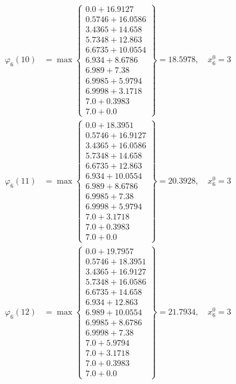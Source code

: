 \documentclass{article}
\begin{document}
\begin{align*}
  
  
  
\varphi_{6}(10) &= \max \left\{ \begin{array}{c}
0.0 + 16.9127 \\
 0.5746 + 16.0586 \\
 3.4365 + 14.658 \\
 5.7348 + 12.863 \\
 6.6735 + 10.0554 \\
 6.934 + 8.6786 \\
 6.989 + 7.38 \\
 6.9985 + 5.9794 \\
 6.9998 + 3.1718 \\
 7.0 + 0.3983 \\
 7.0 + 0.0
\end{array} \right\}=18.5978,\quad x_{6}^0=3\\
  
  
  
  
\varphi_{6}(11) &= \max \left\{ \begin{array}{c}
0.0 + 18.3951 \\
 0.5746 + 16.9127 \\
 3.4365 + 16.0586 \\
 5.7348 + 14.658 \\
 6.6735 + 12.863 \\
 6.934 + 10.0554 \\
 6.989 + 8.6786 \\
 6.9985 + 7.38 \\
 6.9998 + 5.9794 \\
 7.0 + 3.1718 \\
 7.0 + 0.3983 \\
 7.0 + 0.0
\end{array} \right\}=20.3928,\quad x_{6}^0=3\\
  
  
  
  
\varphi_{6}(12) &= \max \left\{ \begin{array}{c}
0.0 + 19.7957 \\
 0.5746 + 18.3951 \\
 3.4365 + 16.9127 \\
 5.7348 + 16.0586 \\
 6.6735 + 14.658 \\
 6.934 + 12.863 \\
 6.989 + 10.0554 \\
 6.9985 + 8.6786 \\
 6.9998 + 7.38 \\
 7.0 + 5.9794 \\
 7.0 + 3.1718 \\
 7.0 + 0.3983 \\
 7.0 + 0.0
\end{array} \right\}=21.7934,\quad x_{6}^0=3\\
  

\end{align*}
\end{document}
